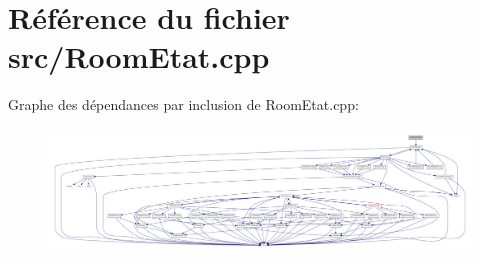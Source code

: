 \section{Référence du fichier src/\-Room\-Etat.cpp}
\label{_room_etat_8cpp}
Graphe des dépendances par inclusion de Room\-Etat.\-cpp\-:
\nopagebreak
\begin{figure}[H]
\begin{center}
\leavevmode
\includegraphics[width=350pt]{_room_etat_8cpp__incl}
\end{center}
\end{figure}
